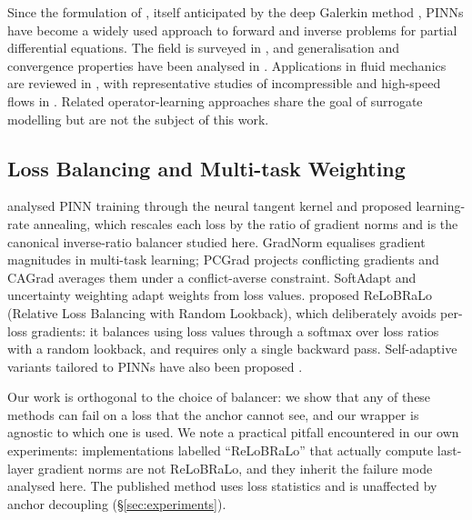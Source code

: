 \documentclass[a4paper,fleqn]{cas-sc}
\begin{document}
Since the formulation of \citet{raissi2019physics}, itself
anticipated by the deep Galerkin method \citep{sirignano2018dgm}, PINNs have
become a widely used approach to forward and inverse problems for partial
differential equations. The field is surveyed in
\citep{karniadakis2021physics,cuomo2022scientific,blechschmidt2021three}, and
generalisation and convergence properties have been analysed in
\citep{shin2020pinn,mishra2022estimates}. Applications in fluid mechanics are
reviewed in \citep{cai2021physics}, with representative studies of
incompressible and high-speed flows in
\citep{jin2021nsfnets,mao2020physics}. Related operator-learning approaches
\citep{lu2021learning,li2021fourier} share the goal of surrogate modelling but
are not the subject of this work.

\subsection{Loss Balancing and Multi-task Weighting}

\citet{wang2021understanding} analysed PINN training through the
neural tangent kernel \citep{jacot2018neural} and proposed learning-rate
annealing, which rescales each loss by the ratio of gradient norms and is the
canonical inverse-ratio balancer studied here. GradNorm
\citep{chen2018gradnorm} equalises gradient magnitudes in multi-task learning;
PCGrad \citep{yu2020gradient} projects conflicting gradients and CAGrad
\citep{liu2021conflict} averages them under a conflict-averse constraint.
SoftAdapt \citep{heydari2019softadapt} and uncertainty weighting
\citep{kendall2018multi} adapt weights from loss values. \citet{bischof2021multi} proposed ReLoBRaLo (Relative Loss Balancing with Random
Lookback), which deliberately avoids per-loss gradients: it balances using loss
values through a softmax over loss ratios with a random lookback, and requires
only a single backward pass. Self-adaptive variants tailored to PINNs have also
been proposed \citep{xiang2022self,mcclenny2023self}.

Our work is orthogonal to the choice of balancer: we show that any of these
methods can fail on a loss that the anchor cannot see, and our wrapper is
agnostic to which one is used. We note a practical pitfall encountered in our
own experiments: implementations labelled ``ReLoBRaLo'' that actually compute
last-layer gradient norms are not ReLoBRaLo, and they inherit the failure mode
analysed here. The published method uses loss statistics and is unaffected by
anchor decoupling (\S\ref{sec:experiments}).
\end{document}
